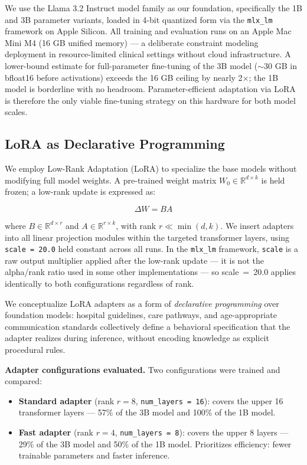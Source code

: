 \documentclass[journal]{IEEEtai}
\begin{document}
We use the Llama 3.2 Instruct model family \cite{dubey2024llama3} as our foundation, specifically the 1B and 3B parameter variants, loaded in 4-bit quantized form via the \texttt{mlx\_lm} framework \cite{apple2023mlx} on Apple Silicon. All training and evaluation runs on an Apple Mac Mini M4 (16 GB unified memory) --- a deliberate constraint modeling deployment in resource-limited clinical settings without cloud infrastructure. A lower-bound estimate for full-parameter fine-tuning of the 3B model ($\sim$30 GB in bfloat16 before activations) exceeds the 16 GB ceiling by nearly 2$\times$; the 1B model is borderline with no headroom. Parameter-efficient adaptation via LoRA is therefore the only viable fine-tuning strategy on this hardware for both model scales.

\subsection{LoRA as Declarative Programming}

We employ Low-Rank Adaptation (LoRA) \cite{hu2022lora} to specialize the base models without modifying full model weights. A pre-trained weight matrix $W_0 \in \mathbb{R}^{d \times k}$ is held frozen; a low-rank update is expressed as:

\begin{equation}
\Delta W = BA
\end{equation}

where $B \in \mathbb{R}^{d \times r}$ and $A \in \mathbb{R}^{r \times k}$, with rank $r \ll \min(d, k)$. We insert adapters into all linear projection modules within the targeted transformer layers, using \texttt{scale = 20.0} held constant across all runs. In the \texttt{mlx\_lm} framework, \texttt{scale} is a raw output multiplier applied after the low-rank update --- it is not the alpha/rank ratio used in some other implementations --- so scale~=~20.0 applies identically to both configurations regardless of rank.

We conceptualize LoRA adapters as a form of \textit{declarative programming} over foundation models: hospital guidelines, care pathways, and age-appropriate communication standards collectively define a behavioral specification that the adapter realizes during inference, without encoding knowledge as explicit procedural rules.

\textbf{Adapter configurations evaluated.} Two configurations were trained and compared:

\begin{itemize}
    \item \textbf{Standard adapter} (rank $r = 8$, \texttt{num\_layers = 16}): covers the upper 16 transformer layers --- 57\% of the 3B model and 100\% of the 1B model.
    \item \textbf{Fast adapter} (rank $r = 4$, \texttt{num\_layers = 8}): covers the upper 8 layers --- 29\% of the 3B model and 50\% of the 1B model. Prioritizes efficiency: fewer trainable parameters and faster inference.
\end{itemize}
\end{document}
